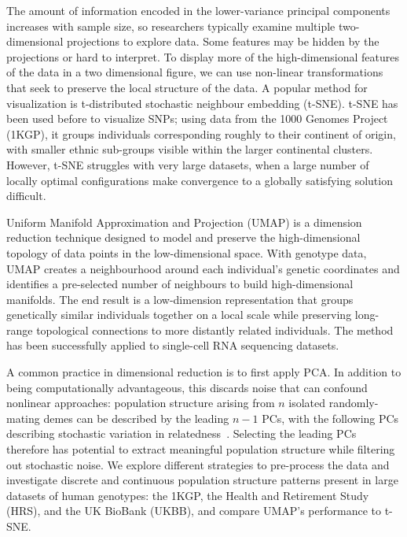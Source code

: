 \documentclass[12pt]{pnas-new}
\begin{document}
The amount of information encoded in the lower-variance principal components increases with sample size, so researchers typically examine multiple two-dimensional projections to explore data. Some features may be hidden by the projections or hard to interpret. To display more of the high-dimensional features of the data in a two dimensional figure, we can use non-linear transformations that seek to preserve the local structure of the data. A popular method for visualization is t-distributed stochastic neighbour embedding (t-SNE)\cite{maaten2008visualizing}. t-SNE has been used before to visualize SNPs\cite{platzer2013visualization}; using data from the 1000 Genomes Project (1KGP)\cite{10002015global}, it groups individuals corresponding roughly to their continent of origin, with smaller ethnic sub-groups visible within the larger continental clusters\cite{li2017tsne}. However, t-SNE struggles with very large datasets, when a large number of locally optimal configurations make convergence to a globally satisfying solution difficult. 

Uniform Manifold Approximation and Projection (UMAP) is a dimension reduction technique designed to model and preserve the high-dimensional topology of data points in the low-dimensional space\cite{2018arXivUMAP}. With genotype data, UMAP creates a neighbourhood around each individual's genetic coordinates and identifies a pre-selected number of neighbours to build high-dimensional manifolds. The end result is a low-dimension representation that groups genetically similar individuals together on a local scale while preserving long-range topological connections to more distantly related individuals. The method has been successfully applied to single-cell RNA sequencing datasets\cite{umap2018singlecell}.

A common practice in dimensional reduction is to first apply PCA. In addition to being computationally advantageous, this discards noise that can confound nonlinear approaches: population structure arising from $n$ isolated randomly-mating demes can be described by the leading $n-1$ PCs, with the following PCs describing stochastic variation in relatedness~\cite{eigen2006}. Selecting the leading PCs therefore has potential to extract meaningful population structure while filtering out stochastic noise. We explore different strategies to pre-process the data and investigate discrete and continuous population structure patterns present in large datasets of human genotypes: the 1KGP, the Health and Retirement Study (HRS)\cite{juster1995overview}, and the UK BioBank (UKBB)\cite{sudlow2015uk}, and compare UMAP's performance to t-SNE.  
\end{document}
